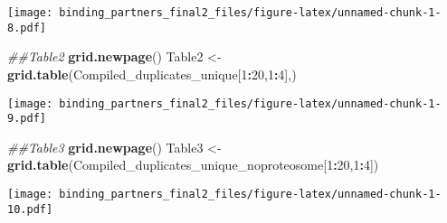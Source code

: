 \documentclass[]{article}
\newenvironment{Shaded}{\begin{snugshade}}{\end{snugshade}}
\newcommand{\CommentTok}[1]{\textcolor[rgb]{0.56,0.35,0.01}{\textit{#1}}}
\newcommand{\DecValTok}[1]{\textcolor[rgb]{0.00,0.00,0.81}{#1}}
\newcommand{\KeywordTok}[1]{\textcolor[rgb]{0.13,0.29,0.53}{\textbf{#1}}}
\newcommand{\NormalTok}[1]{#1}
\newcommand{\OperatorTok}[1]{\textcolor[rgb]{0.81,0.36,0.00}{\textbf{#1}}}
\newcommand{\StringTok}[1]{\textcolor[rgb]{0.31,0.60,0.02}{#1}}
\begin{document}
\texttt{[image: binding\_partners\_final2\_files/figure-latex/unnamed-chunk-1-8.pdf]}

\begin{Shaded}
\begin{Highlighting}[]
\CommentTok{##Table2}
\KeywordTok{grid.newpage}\NormalTok{()}
\NormalTok{Table2 <-}\StringTok{ }\KeywordTok{grid.table}\NormalTok{(Compiled_duplicates_unique[}\DecValTok{1}\OperatorTok{:}\DecValTok{20}\NormalTok{,}\DecValTok{1}\OperatorTok{:}\DecValTok{4}\NormalTok{],)}
\end{Highlighting}
\end{Shaded}

\texttt{[image: binding\_partners\_final2\_files/figure-latex/unnamed-chunk-1-9.pdf]}

\begin{Shaded}
\begin{Highlighting}[]
\CommentTok{##Table3}
\KeywordTok{grid.newpage}\NormalTok{()}
\NormalTok{Table3 <-}\StringTok{ }\KeywordTok{grid.table}\NormalTok{(Compiled_duplicates_unique_noproteosome[}\DecValTok{1}\OperatorTok{:}\DecValTok{20}\NormalTok{,}\DecValTok{1}\OperatorTok{:}\DecValTok{4}\NormalTok{])}
\end{Highlighting}
\end{Shaded}

\texttt{[image: binding\_partners\_final2\_files/figure-latex/unnamed-chunk-1-10.pdf]}
\end{document}
